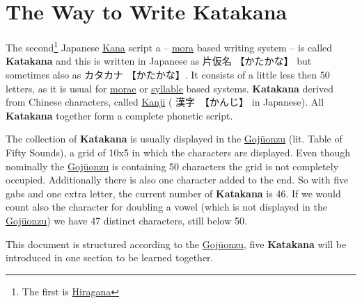 \chapter{The Way to Write Katakana}
\label{chap:TheWayToWriteKatakana}

The second\footnote{The first is \hyperref[sec:Hiragana]{Hiragana}} Japanese
\hyperref[sec:Kana]{Kana} script a -- \hyperref[sec:Mora]{mora} based writing
system -- is called \textbf{Katakana} and this is written in Japanese as
{片仮名} {【かたかな】} but sometimes also as {カタカナ} {【かたかな】}. It
consists of a little less then 50 letters, as it is usual for
\hyperref[sec:Mora]{morae} or \hyperref[sec:Syllable]{syllable} based systems.
\textbf{Katakana} derived from Chinese characters, called
\hyperref[sec:Kanji]{Kanji} ( {漢字}　{【かんじ】} in Japanese). All
\textbf{Katakana} together form a complete phonetic script.


The collection of \textbf{Katakana} is usually displayed in the
\hyperref[sec:Gojuonzu]{Gojūonzu} (lit. Table of Fifty Sounds), a grid of 10x5
in which the characters are displayed. Even though nominally the
\hyperref[sec:Gojuonzu]{Gojūonzu} is containing 50 characters the grid is not
completely occupied. Additionally there is also one character added to the end.
So with five gabs and one extra letter, the current number of \textbf{Katakana}
is 46. If we would count also the character for doubling a vowel (which is not
displayed in the \hyperref[sec:Gojuonzu]{Gojūonzu}) we have 47 distinct
characters, still below 50. 



This document is structured according to the \hyperref[sec:Gojuonzu]{Gojūonzu},
five \textbf{Katakana} will be introduced in one section to be learned
together.



